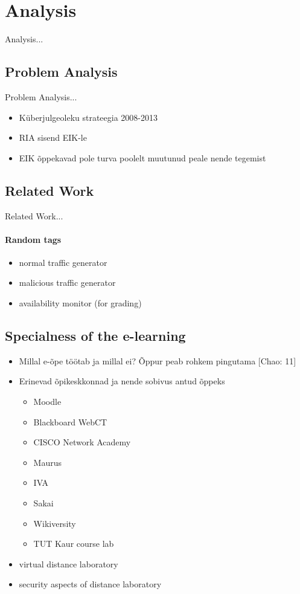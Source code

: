 \chapter{Analysis}
\label{analysis}
Analysis...


\section{Problem Analysis}
\label{Problem Analysis}
Problem Analysis...
\begin{itemize}
	\item Küberjulgeoleku strateegia 2008-2013
	\item RIA sisend EIK-le
	\item EIK õppekavad pole turva poolelt muutunud peale nende tegemist
\end{itemize}

\section{Related Work}
\label{Related Work}
Related Work...




\subsubsection{Random tags}
\begin{itemize}
	\item normal traffic generator
	\item malicious traffic generator
	\item availability monitor (for grading)
\end{itemize}

\section{Specialness of the e-learning}
\begin{itemize}
	\item Millal e-õpe töötab ja millal ei? Õppur peab rohkem pingutama [Chao: 11]
	\item Erinevad õpikeskkonnad ja nende sobivus antud õppeks
		\begin{itemize}
			\item Moodle
			\item Blackboard WebCT
			\item CISCO Network Academy
			\item Maurus
			\item IVA
			\item Sakai
			\item Wikiversity
			\item TUT Kaur course lab
		\end{itemize}
	\item virtual distance laboratory
	\item security aspects of distance laboratory
\end{itemize}

